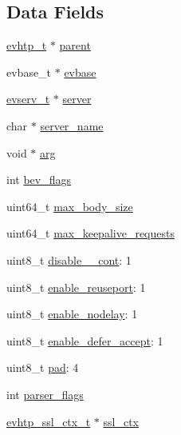 \subsection*{Data Fields}
\begin{DoxyCompactItemize}
\item 
\hyperlink{evhtp_8h_aa670c92d77f9a732e03a7d48ada2b31b}{evhtp\-\_\-t} $\ast$ \hyperlink{structevhtp__s_adff9fa3bd346936d706e1a30c3bf4ca1}{parent}
\item 
evbase\-\_\-t $\ast$ \hyperlink{structevhtp__s_abc4ce26b166a97e5766105f253a4fe21}{evbase}
\item 
\hyperlink{evhtp_8h_accea3745ada200d1acc361354315579c}{evserv\-\_\-t} $\ast$ \hyperlink{structevhtp__s_adbf9415567b9a26229148539d64a5eda}{server}
\item 
char $\ast$ \hyperlink{structevhtp__s_a4e06dd572147d48785afd0439576487a}{server\-\_\-name}
\item 
void $\ast$ \hyperlink{structevhtp__s_a9ce2ec4812a92cb6ab39f6e81e9173a9}{arg}
\item 
int \hyperlink{structevhtp__s_a8d3f621cd735373f6657f8ea1a4d21de}{bev\-\_\-flags}
\item 
uint64\-\_\-t \hyperlink{structevhtp__s_ac0c51866465cd3ccc68751b0ce806cbc}{max\-\_\-body\-\_\-size}
\item 
uint64\-\_\-t \hyperlink{structevhtp__s_a79992dc6217af1d8e8801040ca6ef21e}{max\-\_\-keepalive\-\_\-requests}
\item 
uint8\-\_\-t \hyperlink{structevhtp__s_a080501d1bfb2e3144769e7e8ac9b7225}{disable\-\_\-\_\-cont}\-: 1
\item 
uint8\-\_\-t \hyperlink{structevhtp__s_a6d985d690e3d26f87d8a7345c2226fed}{enable\-\_\-reuseport}\-: 1
\item 
uint8\-\_\-t \hyperlink{structevhtp__s_ac550f99410cfa96e60a714fd16a7665d}{enable\-\_\-nodelay}\-: 1
\item 
uint8\-\_\-t \hyperlink{structevhtp__s_a9c0ae79aec9b8805cc2ff3fbc0d6eb77}{enable\-\_\-defer\-\_\-accept}\-: 1
\item 
uint8\-\_\-t \hyperlink{structevhtp__s_ac1a86b4f13c0cf801df27e12ce75f046}{pad}\-: 4
\item 
int \hyperlink{structevhtp__s_ad4fd469906d549a4621db759d7f214ca}{parser\-\_\-flags}
\item 
\hyperlink{evhtp_8h_a3a45854457c03a9028160078945046da}{evhtp\-\_\-ssl\-\_\-ctx\-\_\-t} $\ast$ \hyperlink{structevhtp__s_a21d5d9eef41ecdb08b82db795aa6da98}{ssl\-\_\-ctx}
\item 

\end{DoxyCompactItemize}
